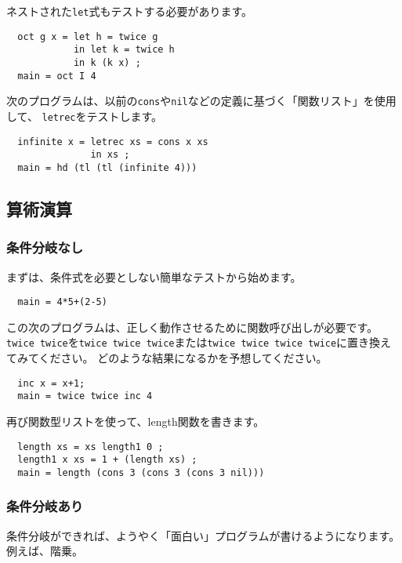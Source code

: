 \documentclass{jarticle}
\begin{document}
ネストされた\texttt{let}式もテストする必要があります。

\begin{verbatim}
  oct g x = let h = twice g
            in let k = twice h
            in k (k x) ;
  main = oct I 4
\end{verbatim}

次のプログラムは、以前の\texttt{cons}や\texttt{nil}などの定義に基づく「関数リスト」を使用して、
\texttt{letrec}をテストします。

\begin{verbatim}
  infinite x = letrec xs = cons x xs
               in xs ;
  main = hd (tl (tl (infinite 4)))
\end{verbatim}
\newpage

\subsection{算術演算}

\subsubsection{条件分岐なし}

まずは、条件式を必要としない簡単なテストから始めます。

\begin{verbatim}
  main = 4*5+(2-5)
\end{verbatim}

この次のプログラムは、正しく動作させるために関数呼び出しが必要です。
\texttt{twice twice}を\texttt{twice twice twice}または\texttt{twice twice twice twice}に置き換えてみてください。
どのような結果になるかを予想してください。

\begin{verbatim}
  inc x = x+1;
  main = twice twice inc 4
\end{verbatim}

再び関数型リストを使って、length関数を書きます。

\begin{verbatim}
  length xs = xs length1 0 ;
  length1 x xs = 1 + (length xs) ;
  main = length (cons 3 (cons 3 (cons 3 nil)))
\end{verbatim}

\subsubsection{条件分岐あり}

条件分岐ができれば、ようやく「面白い」プログラムが書けるようになります。
例えば、階乗。
\end{document}
